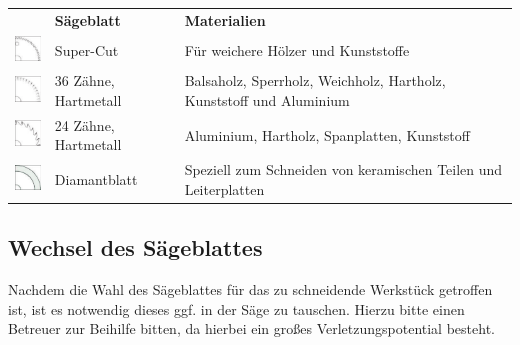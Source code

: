 \documentclass{\basedir/fablab-document}
\begin{document}
\begin{table}[h]
	\centering
	\begin{tabular}{lll}
		&\textbf{Sägeblatt}  & \textbf{Materialien} \\
		\includegraphics[width=1cm]{bilder/super_cut.pdf}&Super-Cut & Für weichere Hölzer und Kunststoffe \\
		\includegraphics[width=1cm]{bilder/36zahne.pdf}&36 Zähne, Hartmetall &  Balsaholz, Sperrholz, Weichholz, Hartholz, Kunststoff und Aluminium\\
		\includegraphics[width=1cm]{bilder/24zahne.pdf}&24 Zähne, Hartmetall & Aluminium, Hartholz, Spanplatten, Kunststoff \\
		\includegraphics[width=1cm]{bilder/diamant.pdf}&Diamantblatt & Speziell zum Schneiden von keramischen Teilen und Leiterplatten
	\end{tabular}
\end{table}

\subsection{Wechsel des Sägeblattes}

Nachdem die Wahl des Sägeblattes für das zu schneidende Werkstück getroffen ist, ist es notwendig dieses ggf. in der Säge zu tauschen. Hierzu bitte einen Betreuer zur Beihilfe bitten, da hierbei ein großes Verletzungspotential besteht. 
\end{document}
